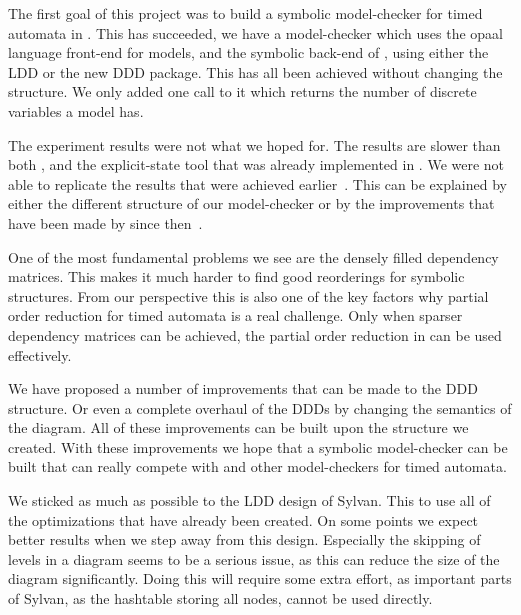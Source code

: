 The first goal of this project was to build a symbolic model-checker for timed automata in \ltsmin{}. This has succeeded, we have a model-checker which uses the opaal language front-end for \uppaal{} models, and the symbolic back-end of \ltsmin{}, using either the LDD or the new DDD package. This has all been achieved without changing the \pins{} structure. We only added one call to it which returns the number of discrete variables a model has. 

The experiment results were not what we hoped for. The results are slower than both \uppaal{}, and the explicit-state tool that was already implemented in \ltsmin{}. We were not able to replicate the results that were achieved earlier~\cite{ddds}. This can be explained by either the different structure of our model-checker or by the improvements that have been made by \uppaal{} since then~\cite{bbdlpw-ftrtft02}. 

One of the most fundamental problems we see are the densely filled dependency matrices. This makes it much harder to find good reorderings for symbolic structures. From our perspective this is also one of the key factors why partial order reduction for timed automata is a real challenge. Only when sparser dependency matrices can be achieved, the partial order reduction in \ltsmin{} can be used effectively. 

We have proposed a number of improvements that can be made to the DDD structure. Or even a complete overhaul of the DDDs by changing the semantics of the diagram. All of these improvements can be built upon the structure we created. With these improvements we hope that a symbolic model-checker can be built that can really compete with \uppaal{} and other model-checkers for timed automata. 

We sticked as much as possible to the LDD design of Sylvan. This to use all of the optimizations that have already been created. On some points we expect better results when we step away from this design. Especially the skipping of levels in a diagram seems to be a serious issue, as this can reduce the size of the diagram significantly. Doing this will require some extra effort, as important parts of Sylvan, as the hashtable storing all nodes, cannot be used directly. 